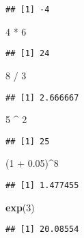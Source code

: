 \documentclass[]{book}
\newenvironment{Shaded}{\begin{snugshade}}{\end{snugshade}}
\newcommand{\KeywordTok}[1]{\textcolor[rgb]{0.13,0.29,0.53}{\textbf{{#1}}}}
\newcommand{\DecValTok}[1]{\textcolor[rgb]{0.00,0.00,0.81}{{#1}}}
\newcommand{\FloatTok}[1]{\textcolor[rgb]{0.00,0.00,0.81}{{#1}}}
\newcommand{\StringTok}[1]{\textcolor[rgb]{0.31,0.60,0.02}{{#1}}}
\newcommand{\NormalTok}[1]{{#1}}
\begin{document}
\begin{verbatim}
## [1] -4
\end{verbatim}

\begin{Shaded}
\begin{Highlighting}[]
\DecValTok{4} \NormalTok{*}\StringTok{ }\DecValTok{6}
\end{Highlighting}
\end{Shaded}

\begin{verbatim}
## [1] 24
\end{verbatim}

\begin{Shaded}
\begin{Highlighting}[]
\DecValTok{8} \NormalTok{/}\StringTok{ }\DecValTok{3}
\end{Highlighting}
\end{Shaded}

\begin{verbatim}
## [1] 2.666667
\end{verbatim}

\begin{Shaded}
\begin{Highlighting}[]
\DecValTok{5} \NormalTok{^}\StringTok{ }\DecValTok{2}
\end{Highlighting}
\end{Shaded}

\begin{verbatim}
## [1] 25
\end{verbatim}

\begin{Shaded}
\begin{Highlighting}[]
\NormalTok{(}\DecValTok{1} \NormalTok{+}\StringTok{ }\FloatTok{0.05}\NormalTok{)^}\DecValTok{8}
\end{Highlighting}
\end{Shaded}

\begin{verbatim}
## [1] 1.477455
\end{verbatim}

\begin{Shaded}
\begin{Highlighting}[]
\KeywordTok{exp}\NormalTok{(}\DecValTok{3}\NormalTok{)}
\end{Highlighting}
\end{Shaded}

\begin{verbatim}
## [1] 20.08554
\end{verbatim}
\end{document}

